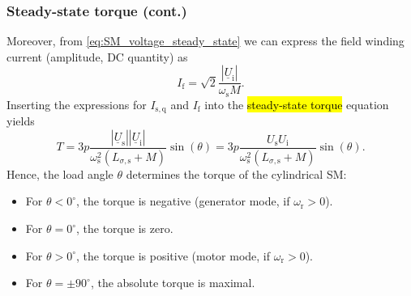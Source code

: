 \begin{frame}
	\frametitle{Steady-state torque (cont.)}
	\onslide<+->
	Moreover, from \eqref{eq:SM_voltage_steady_state} we can express the field winding current (amplitude, DC quantity) as
	\begin{equation}
		I_\mathrm{f} = \sqrt{2}\frac{\left|\underline{U}_\mathrm{i}\right|}{\omega_\mathrm{s}M}.
	\end{equation}
	\onslide<+->
	Inserting the expressions for $I_\mathrm{s,q}$ and $I_\mathrm{f}$ into the \hl{steady-state torque} equation yields
	\begin{equation}
		T = 3 p \frac{\left|\underline{U}_\mathrm{s}\right| \left|\underline{U}_\mathrm{i}\right|}{\omega_\mathrm{s}^2 \left(L_{\sigma,\mathrm{s}} + M\right)}  \sin(\theta)  = 3 p \frac{U_\mathrm{s} U_\mathrm{i}}{\omega_\mathrm{s}^2 \left(L_{\sigma,\mathrm{s}} + M\right)}  \sin(\theta).
		\label{eq:SM_torque_steady_state}
	\end{equation}
	\onslide<+->
	Hence, the load angle $\theta$ determines the torque of the cylindrical SM:
	\begin{itemize}
		\item<+-> For $\theta < 0^\circ$, the torque is negative (generator mode, if $\omega_\mathrm{r}>0$).
		\item<+-> For $\theta = 0^\circ$, the torque is zero.
		\item<+-> For $\theta > 0^\circ$, the torque is positive (motor mode, if $\omega_\mathrm{r}>0$).
		\item<+-> For $\theta = \pm 90^\circ$, the absolute torque is maximal.
	\end{itemize}
\end{frame}

